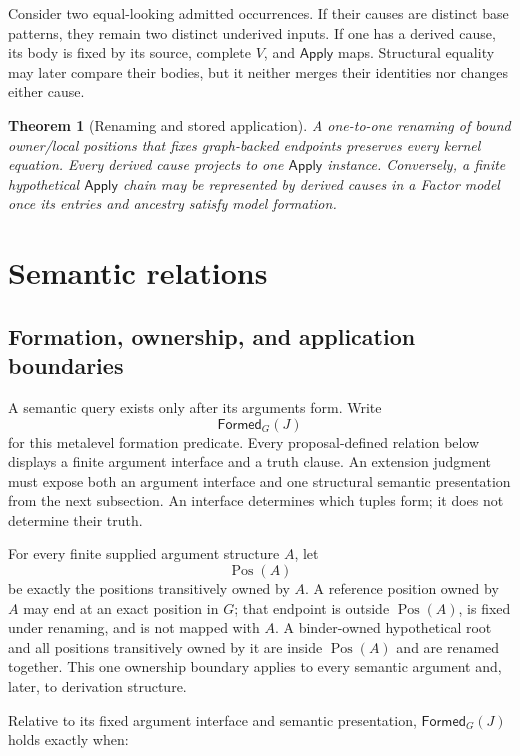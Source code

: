\documentclass[11pt,twoside]{article}
\newcommand{\Apply}{\mathsf{Apply}}
\newcommand{\Formed}{\mathsf{Formed}}
\newtheorem{theorem}{Theorem}
\begin{document}
Consider two equal-looking admitted occurrences.  If their causes are distinct base
patterns, they remain two distinct underived inputs.  If one has a derived cause,
its body is fixed by its source, complete \(V\), and \(\Apply\) maps.  Structural
equality may later compare their bodies, but it neither merges their identities nor
changes either cause.

\begin{theorem}[Renaming and stored application]\label{thm:kernel-renaming}
A one-to-one renaming of bound owner/local positions that fixes graph-backed
endpoints preserves every kernel equation.  Every derived cause projects to one
\(\Apply\) instance.  Conversely, a finite hypothetical \(\Apply\) chain may be
represented by derived causes in a Factor model once its entries and ancestry
satisfy model formation.
\end{theorem}

\section{Semantic relations}\label{sec:semantics}

\subsection{Formation, ownership, and application boundaries}

A semantic query exists only after its arguments form.  Write
\[
  \Formed_G(J)
\]
for this metalevel formation predicate.  Every proposal-defined relation below
displays a finite argument interface and a truth clause.  An extension judgment
must expose both an argument interface and one structural semantic presentation
from the next subsection.  An interface determines which tuples form; it does not
determine their truth.

For every finite supplied argument structure \(A\), let
\[
  \operatorname{Pos}(A)
\]
be exactly the positions transitively owned by \(A\).  A reference position owned
by \(A\) may end at an exact position in \(G\); that endpoint is outside
\(\operatorname{Pos}(A)\), is fixed under renaming, and is not mapped with \(A\).
A binder-owned hypothetical root and all positions transitively owned by it are
inside \(\operatorname{Pos}(A)\) and are renamed together.  This one ownership
boundary applies to every semantic argument and, later, to derivation structure.

Relative to its fixed argument interface and semantic presentation,
\(\Formed_G(J)\) holds exactly when:
\end{document}
